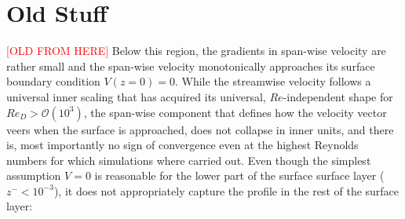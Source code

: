 \documentclass[smallcondensed,final]{svjour3}
\newcommand{\todo}[1]{\textcolor{red}{$[$#1$]$}}
\begin{document}
\appendix
\section{Old Stuff}
\todo{OLD FROM HERE} 
Below this region, the gradients in span-wise velocity are rather small and the span-wise velocity
monotonically approaches its surface boundary condition $V(z=0)=0$.
%
While the streamwise velocity follows a universal inner scaling that has acquired its universal, $Re$-independent shape for $Re_D> \mathcal{O}\left(10^3\right)$, the span-wise component that defines how the velocity vector veers when the surface is approached,
does not collapse in inner units, and there is, most importantly no sign of convergence even at the highest Reynolds numbers for
which simulations where carried out.
%
Even though the simplest assumption $V=0$ is reasonable for the lower part of the surface surface layer ($z^-<10^{-3}$), it does
not appropriately capture the profile in the rest of the surface layer:
\end{document}
